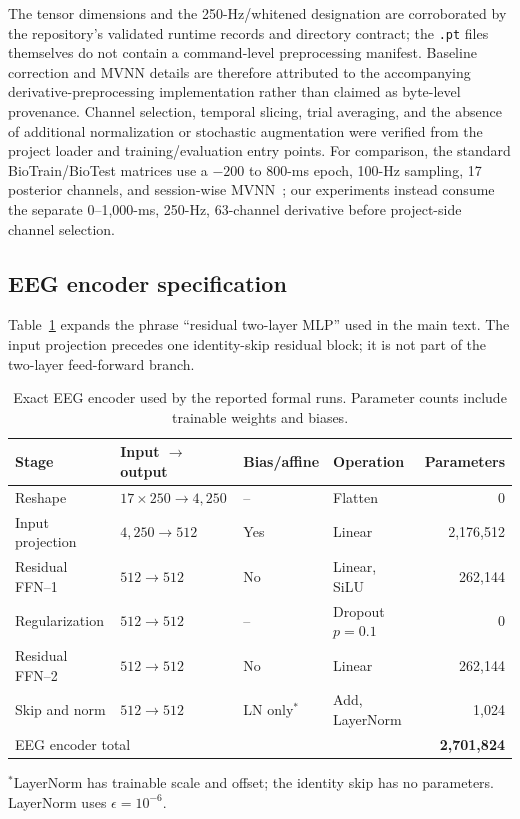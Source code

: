 \documentclass{article}
\begin{document}
The tensor dimensions and the 250-Hz/whitened designation are corroborated by
the repository's validated runtime records and directory contract; the
\texttt{.pt} files themselves do not contain a command-level preprocessing
manifest. Baseline correction and MVNN details are therefore attributed to the
accompanying derivative-preprocessing implementation rather than claimed as
byte-level provenance. Channel selection, temporal slicing, trial averaging,
and the absence of additional normalization or stochastic augmentation were
verified from the project loader and training/evaluation entry points. For
comparison, the standard BioTrain/BioTest matrices use a $-200$ to 800-ms
epoch, 100-Hz sampling, 17 posterior channels, and session-wise
MVNN~\citep{gifford2022things}; our experiments instead consume the separate
0--1,000-ms, 250-Hz, 63-channel derivative before project-side channel
selection.

\subsection{EEG encoder specification}
\label{app:eeg_encoder}

Table~\ref{tab:eeg_encoder_details} expands the phrase ``residual two-layer
MLP'' used in the main text. The input projection precedes one identity-skip
residual block; it is not part of the two-layer feed-forward branch.

\begin{table}[h]
  \centering
  \caption{Exact EEG encoder used by the reported formal runs. Parameter counts
  include trainable weights and biases.}
  \label{tab:eeg_encoder_details}
  \small
  \setlength{\tabcolsep}{4.5pt}
  \begin{tabular}{llllr}
    \toprule
    Stage & Input $\rightarrow$ output & Bias/affine & Operation & Parameters \\
    \midrule
    Reshape & $17\times250\rightarrow4{,}250$ & -- & Flatten & 0 \\
    Input projection & $4{,}250\rightarrow512$ & Yes & Linear & 2,176,512 \\
    Residual FFN--1 & $512\rightarrow512$ & No & Linear, SiLU & 262,144 \\
    Regularization & $512\rightarrow512$ & -- & Dropout $p=0.1$ & 0 \\
    Residual FFN--2 & $512\rightarrow512$ & No & Linear & 262,144 \\
    Skip and norm & $512\rightarrow512$ & LN only$^{*}$ & Add, LayerNorm & 1,024 \\
    \midrule
    \multicolumn{4}{l}{EEG encoder total} & \textbf{2,701,824} \\
    \bottomrule
  \end{tabular}

  \vspace{2pt}
  {\footnotesize $^{*}$LayerNorm has trainable scale and offset; the identity
  skip has no parameters. LayerNorm uses $\epsilon=10^{-6}$.}
\end{table}
\end{document}
